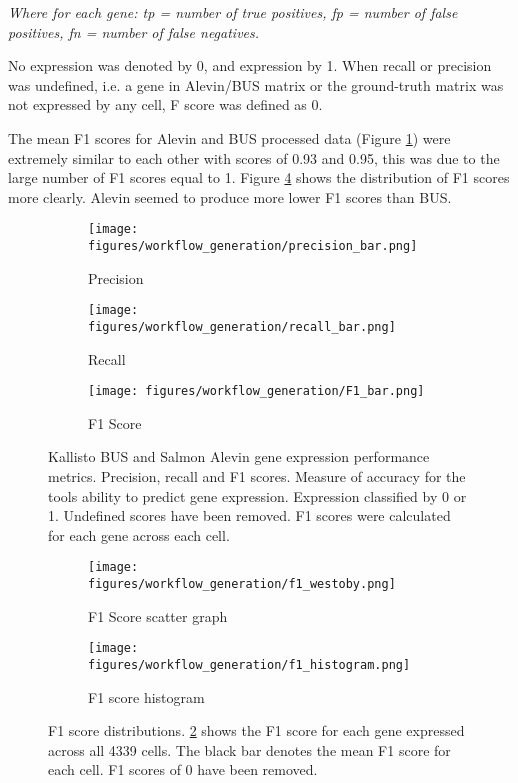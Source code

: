 \textit{Where for each gene: tp = number of true positives, fp = number of false positives, fn = number of false negatives.}


No expression was denoted by 0, and expression by 1.
When recall or precision was undefined, i.e. a gene in Alevin/BUS matrix or the ground-truth matrix was not expressed by any cell, F score was defined as 0.

The mean F1 scores for Alevin and BUS processed data (Figure \ref{fig:precision_recall_f1_bar}) were extremely similar to each other with scores of 0.93 and 0.95, this was due to the large number of F1 scores equal to 1.
Figure \ref{fig:westoby_histogram} shows the distribution of F1 scores more clearly.
Alevin seemed to produce more lower F1 scores than BUS\@.

\begin{figure}[h]
\centering
\begin{subfigure}{0.32\textwidth}
    \texttt{[image: figures/workflow\_generation/precision\_bar.png]}
    \caption{Precision}
\end{subfigure}
\begin{subfigure}{0.32\textwidth}
    \texttt{[image: figures/workflow\_generation/recall\_bar.png]}
    \caption{Recall}
\end{subfigure}
\begin{subfigure}{0.32\textwidth}
    \centering
    \texttt{[image: figures/workflow\_generation/F1\_bar.png]}
    \caption{F1 Score}
\end{subfigure}
\caption[Kallisto BUS and Salmon Alevin gene expression performance metrics]{Kallisto BUS and Salmon Alevin gene expression performance metrics. Precision, recall and F1 scores.
Measure of accuracy for the tools ability to predict gene expression.
Expression classified by 0 or 1.
Undefined scores have been removed.
F1 scores were calculated for each gene across each cell.}
\label{fig:precision_recall_f1_bar}
\end{figure}
%
\begin{figure}[h]
\begin{subfigure}{0.5\textwidth}
    \texttt{[image: figures/workflow\_generation/f1\_westoby.png]}
    \caption{F1 Score scatter graph}
    \label{fig:f1_westoby}
\end{subfigure}
\begin{subfigure}{0.5\textwidth}
    \texttt{[image: figures/workflow\_generation/f1\_histogram.png]}
    \caption{F1 score histogram}
    \label{fig:f1_hist}
\end{subfigure}
\caption[F1 score distribution]{F1 score distributions.
    \ref{fig:f1_westoby} shows the F1 score for each gene expressed across all 4339 cells.
    The black bar denotes the mean F1 score for each cell.
    F1 scores of 0 have been removed.}
\label{fig:westoby_histogram}
\end{figure}

